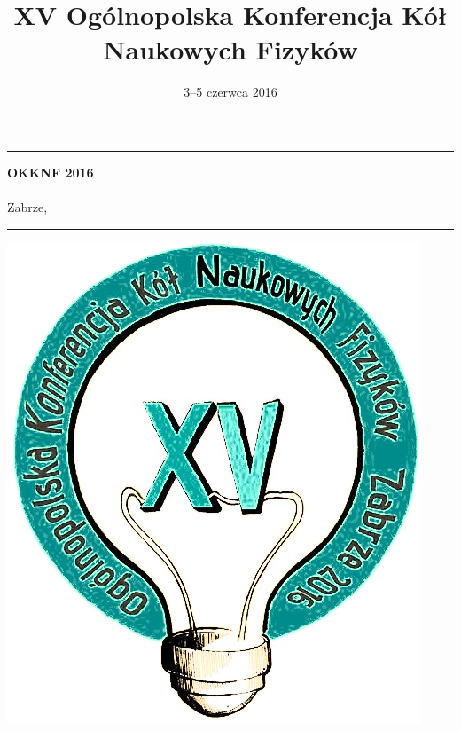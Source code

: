 \documentclass[13pt, a4paper, oneside, notitlepage]{article}
\title{XV Ogólnopolska Konferencja Kół Naukowych Fizyków}
\date{3--5 czerwca 2016}
\begin{document}
\pagestyle{fancy}
\fancyhf{}
\fancyhead[RO,LE]{\thepage}
\fancyhead[LO,RE]{\thetitle}

\begin{titlepage}

\thispagestyle{empty}

\topmargin 2cm
\noindent \rule{\textwidth}{3.0pt}
\begin{center}
	\Huge \textbf{OKKNF 2016} \\
	\vspace{0.5cm}
	\LARGE {\thetitle} \\
	Zabrze, \thedate
\end{center}
\noindent \rule{\textwidth}{3.0pt}

\vspace{1.5cm}

\begin{center}
\includegraphics[scale=0.5]{img/okknf-2016-logo.png}
\end{center}

\end{titlepage}
\newpage

\thispagestyle{empty}
\mbox{}
\newpage
\end{document}
